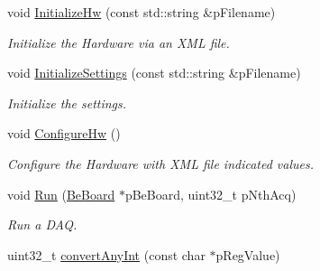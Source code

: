\begin{CompactItemize}
void \hyperlink{class_ph2___system_1_1_system_controller_c8288e41f0375b7b9fa21905dd862124}{Initialize\-Hw} (const std::string \&p\-Filename)
\begin{CompactList}\small\item\em Initialize the Hardware via an XML file. \item\end{CompactList}\item 
void \hyperlink{class_ph2___system_1_1_system_controller_2b52c096bdcb9807a2c4ece6e2eede5f}{Initialize\-Settings} (const std::string \&p\-Filename)
\begin{CompactList}\small\item\em Initialize the settings. \item\end{CompactList}\item 
void \hyperlink{class_ph2___system_1_1_system_controller_f0bb978523eb3a6436650d9e4f112432}{Configure\-Hw} ()
\begin{CompactList}\small\item\em Configure the Hardware with XML file indicated values. \item\end{CompactList}\item 
void \hyperlink{class_ph2___system_1_1_system_controller_566a9fd32ddb038dc935de263a0032f8}{Run} (\hyperlink{class_ph2___hw_description_1_1_be_board}{Be\-Board} $\ast$p\-Be\-Board, uint32\_\-t p\-Nth\-Acq)
\begin{CompactList}\small\item\em Run a DAQ. \item\end{CompactList}\item 
uint32\_\-t \hyperlink{class_ph2___system_1_1_system_controller_ce581fac29aed64061574d5b6c2ab235}{convert\-Any\-Int} (const char $\ast$p\-Reg\-Value)
\end{CompactItemize}
